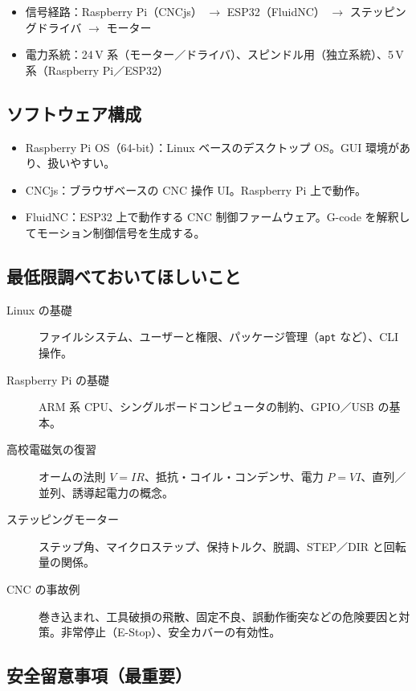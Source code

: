 \documentclass[uplatex,dvipdfmx]{ujarticle}
\begin{document}
\begin{itemize}
  \item 信号経路：Raspberry Pi（CNCjs） $\to$ ESP32（FluidNC） $\to$ ステッピングドライバ $\to$ モーター
  \item 電力系統：24\,V 系（モーター／ドライバ）、スピンドル用（独立系統）、5\,V 系（Raspberry Pi／ESP32）
\end{itemize}

\subsection{ソフトウェア構成}

\begin{itemize}
  \item Raspberry Pi OS（64-bit）：Linux ベースのデスクトップ OS。GUI 環境があり、扱いやすい。
  \item CNCjs：ブラウザベースの CNC 操作 UI。Raspberry Pi 上で動作。
  \item FluidNC：ESP32 上で動作する CNC 制御ファームウェア。G-code を解釈してモーション制御信号を生成する。
\end{itemize}

\subsection{最低限調べておいてほしいこと}

\begin{description}
  \item[Linux の基礎] ファイルシステム、ユーザーと権限、パッケージ管理（\texttt{apt} など）、CLI 操作。
  \item[Raspberry Pi の基礎] ARM 系 CPU、シングルボードコンピュータの制約、GPIO／USB の基本。
  \item[高校電磁気の復習] オームの法則 $V=IR$、抵抗・コイル・コンデンサ、電力 $P=VI$、直列／並列、誘導起電力の概念。
  \item[ステッピングモーター] ステップ角、マイクロステップ、保持トルク、脱調、STEP／DIR と回転量の関係。
  \item[CNC の事故例] 巻き込まれ、工具破損の飛散、固定不良、誤動作衝突などの危険要因と対策。非常停止（E-Stop）、安全カバーの有効性。
\end{description}

\subsection{安全留意事項（最重要）}
\end{document}
